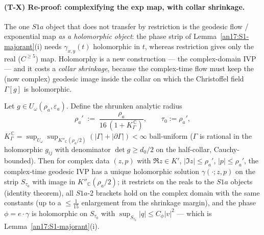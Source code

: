 \paragraph{(T-X) Re-proof: complexifying the exp map, with collar shrinkage.} The
one $S1a$ object that does not transfer by restriction is the geodesic flow /
exponential map \emph{as a holomorphic object}: the phase strip of
Lemma~\ref{an17:S1-majorant}(i) needs $\gamma_{x,y}(t)$ holomorphic in $t$, whereas
restriction gives only the real ($C^{\ge5}$) map. Holomorphy is a new
construction --- the complex-domain IVP --- and it costs a \emph{collar shrinkage},
because the complex-time flow must keep the (now complex) geodesic image inside
the collar on which the Christoffel field $\Gamma[g]$ is holomorphic.

\begin{theorem}\label{an17:S1-complexify}
Let $g\in U_\omega(\rho_a,\varepsilon_a)$. Define the shrunken analytic radius
\begin{equation}\label{an17:eq-rhoprime}
 \rho_a'\;:=\;\frac{\rho_a}{16\,(1+K_\Gamma^{\,\mathbb C})},\qquad
 \tau_0:=\rho_a',
\end{equation}
$K_\Gamma^{\,\mathbb C}=\sup_{U_\omega}\sup_{K''_{\mathbb C}(\rho_a/2)}
(|\Gamma|+|\partial\Gamma|)<\infty$ ball-uniform \textup{(}$\Gamma$ is rational in
the holomorphic $g_{ij}$ with denominator $\det g\ge d_0/2$ on the half-collar,
Cauchy-bounded\textup{)}. Then for complex data $(z,p)$ with $\Re z\in K'$,
$|\Im z|\le\rho_a'$, $|p|\le\rho_a'$, the complex-time geodesic IVP has a unique
holomorphic solution $\gamma(\cdot;z,p)$ on the strip $S_{\tau_0}$ with image in
$K''_{\mathbb C}(\rho_a/2)$; it restricts on the reals to the $S1a$ objects
\textup{(}identity theorem\textup{)}, all $S1a$-2 brackets hold on the complex
domain with the same constants \textup{(}up to a $\le\tfrac{1}{15}$ enlargement
from the shrinkage margin\textup{)}, and the phase
$\phi=e\cdot\gamma$ is holomorphic on $S_{\tau_0}$ with $\sup_{S_{\tau_0}}|q|\le
C_\phi|v|^2$ --- which is Lemma~\ref{an17:S1-majorant}(i).
\end{theorem}


